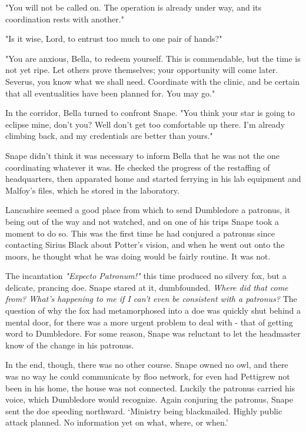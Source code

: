 "You will not be called on. The operation is already under way, and its coordination rests with another."

"Is it wise, Lord, to entrust too much to one pair of hands?"

"You are anxious, Bella, to redeem yourself. This is commendable, but the time is not yet ripe. Let others prove themselves; your opportunity will come later. Severus, you know what we shall need. Coordinate with the clinic, and be certain that all eventualities have been planned for. You may go."

In the corridor, Bella turned to confront Snape. "You think your star is going to eclipse mine, don't you? Well don't get too comfortable up there. I'm already climbing back, and my credentials are better than yours."

Snape didn't think it was necessary to inform Bella that he was not the one coordinating whatever it was. He checked the progress of the restaffing of headquarters, then apparated home and started ferrying in his lab equipment and Malfoy's files, which he stored in the laboratory.

Lancashire seemed a good place from which to send Dumbledore a patronus, it being out of the way and not watched, and on one of his trips Snape took a moment to do so. This was the first time he had conjured a patronus since contacting Sirius Black about Potter's vision, and when he went out onto the moors, he thought what he was doing would be fairly routine. It was not.

The incantation \emph{"Expecto Patronum!"} this time produced no silvery fox, but a delicate, prancing doe. Snape stared at it, dumbfounded. \emph{Where did that come from? What's happening to me if I can't even be consistent with a patronus?} The question of why the fox had metamorphosed into a doe was quickly shut behind a mental door, for there was a more urgent problem to deal with - that of getting word to Dumbledore. For some reason, Snape was reluctant to let the headmaster know of the change in his patronus.

In the end, though, there was no other course. Snape owned no owl, and there was no way he could communicate by floo network, for even had Pettigrew not been in his home, the house was not connected. Luckily the patronus carried his voice, which Dumbledore would recognize. Again conjuring the patronus, Snape sent the doe speeding northward. `Ministry being blackmailed. Highly public attack planned. No information yet on what, where, or when.'

